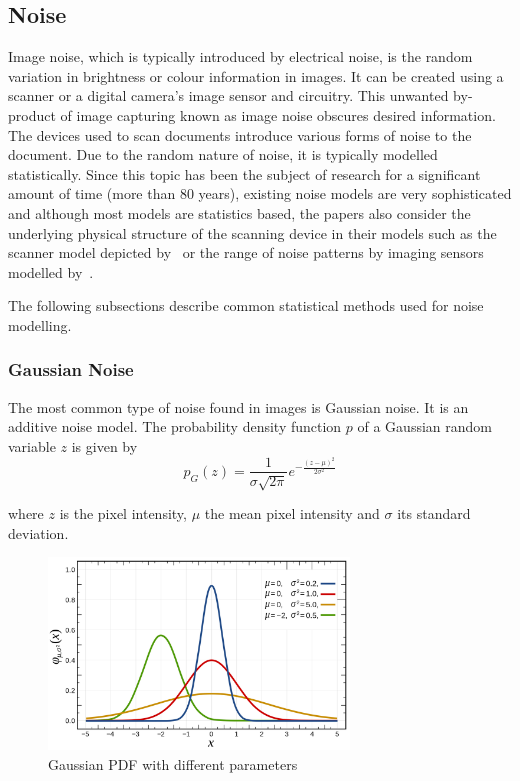 \documentclass[a4paper, 12pt]{report}
\begin{document}
\subsection{Noise}
Image noise, which is typically introduced by electrical noise, is the random
variation in brightness or colour information in images. It can be created
using a scanner or a digital camera's image sensor and circuitry. This unwanted
by-product of image capturing known as image noise obscures desired
information. The devices used to scan documents introduce various forms of
noise to the document. Due to the random nature of noise, it is typically
modelled statistically. Since this topic has been the subject of research for a
significant amount of time (more than 80 years), existing noise models are very
sophisticated and although most models are statistics based, the papers also
consider the underlying physical structure of the scanning device in their
models such as the scanner model depicted by~\cite{gou2007robust} or the range
of noise patterns by imaging sensors modelled by~\cite{lukas2006digital}.\par

The following subsections describe common statistical methods used for noise
modelling.

\subsubsection{Gaussian Noise}
The most common type of noise found in images is Gaussian noise. It is an
additive noise model. The probability density function \(p\) of a Gaussian
random variable \(z\) is given by
\[p_{G}(z)=\frac {1}{\sigma {\sqrt {2\pi }}}e^{-{\frac {(z-\mu )^{2}}{2\sigma ^{2}}}}\]

where \(z\) is the pixel intensity, \(\mu\) the mean pixel intensity and
\(\sigma\) its standard deviation.

\begin{figure}[ht]
    \centering
    \includegraphics[width=8cm]{gaussian distribution.png}
    \caption{Gaussian PDF with different parameters~\cite{gaussian_image}}
    \label{fig:gaussian_image}
\end{figure}
\end{document}
